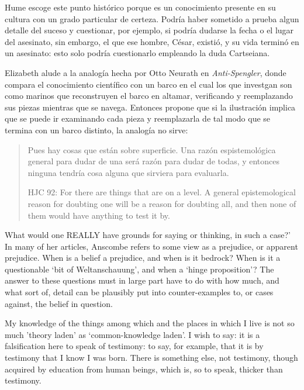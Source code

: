 Hume escoge este punto histórico porque es un conocimiento presente en su
cultura con un grado particular de certeza. Podría haber sometido a prueba algun
detalle del suceso y cuestionar, por ejemplo, si podría dudarse la fecha o el
lugar del asesinato, sin embargo, el que ese hombre, César, existió, y su vida
terminó en un asesinato: esto solo podría cuestionarlo empleando la duda
Cartseiana.

Elizabeth alude a la analogía hecha por Otto Neurath en \emph{Anti-Spengler},
donde compara el conocimiento científico con un barco en el cual los que
investgan son como marinos que reconstruyen el barco en altamar, verificando y
reemplazando sus piezas mientras que se navega. Entonces propone que si la
ilustración implica que se puede ir examinando cada pieza y reemplazarla de tal
modo que se termina con un barco distinto, la analogía no sirve: \blockquote[HJC
92: For there are things that are on a level. A general epistemological reason
for doubting one will be a reason for doubting all, and then none of them would
have anything to test it by.]{Pues hay cosas que están sobre superficie. Una
  razón espistemológica general para dudar de una será razón para dudar de
  todas, y entonces ninguna tendría cosa alguna que sirviera para evaluarla.}


What would one REALLY have grounds for saying or thinking, in such a case?’ In
many of her articles, Anscombe refers to some view as a prejudice, or apparent
prejudice. When is a belief a prejudice, and when is it bedrock? When is it a
questionable ‘bit of Weltanschauung’, and when a ‘hinge proposition’? The answer
to these questions must in large part have to do with how much, and what sort
of, detail can be plausibly put into counter-examples to, or cases against, the
belief in question.

My knowledge of the things among which and the places in which I live is not so
much 'theory laden' as ‘common-knowledge laden'. I wish to say: it is a
falsification here to speak of testimony: to say, for example, that it is by
testimony that I know I was born. There is something else, not testimony, though
acquired by education from human beings, which is, so to speak, thicker than
testimony.

